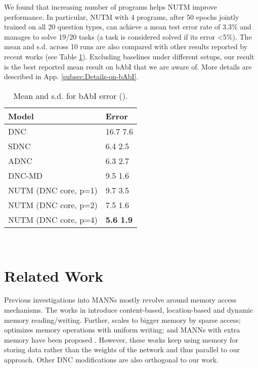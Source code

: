 \documentclass[english]{article}
\providecommand{\tabularnewline}{\\}
\renewcommand{\cite}{\citep}
\begin{document}
We found that increasing number of programs helps NUTM improve performance.
In particular, NUTM with 4 programs, after 50 epochs jointly trained
on all 20 question types, can achieve a mean test error rate of 3.3\%
and manages to solve 19/20 tasks (a task is considered solved if its
error \textless 5\%). The mean and s.d. across 10 runs are also compared
with other results reported by recent works (see Table \ref{tab:Mean-bAbI-error}).
Excluding baselines under different setups, our result is the best
reported mean result on bAbI that we are aware of. More details are
described in App. \ref{subsec:Details-on-bAbI}. 

\begin{table}
\begin{centering}
\begin{tabular}{ll}
\hline 
\multicolumn{1}{l}{Model} & Error\tabularnewline
\hline 
\multicolumn{1}{l}{DNC\cite{graves2016hybrid}} & 16.7 \textpm{} 7.6 \tabularnewline
\multicolumn{1}{l}{SDNC\cite{rae2016scaling}} & 6.4 \textpm{} 2.5 \tabularnewline
\multicolumn{1}{l}{ADNC\cite{W18-2606}} & 6.3 \textpm{} 2.7 \tabularnewline
\multicolumn{1}{l}{DNC-MD\cite{csordas2018improving}} & 9.5 \textpm{} 1.6\tabularnewline
\hline 
NUTM (DNC core, p=1) & 9.7 \textpm{} 3.5\tabularnewline
NUTM (DNC core, p=2) & 7.5 \textpm{} 1.6\tabularnewline
NUTM (DNC core, p=4) & \textbf{5.6 \textpm{} 1.9}\tabularnewline
\hline 
\end{tabular}
\par\end{centering}
~

\caption{Mean and s.d. for bAbI error ().\label{tab:Mean-bAbI-error}}

\end{table}

 
\section{Related Work}

Previous investigations into MANNs mostly revolve around memory access
mechanisms. The works in \citet{graves2014neural,graves2016hybrid}
introduce content-based, location-based and dynamic memory reading/writing.
Further, \citet{rae2016scaling} scales to bigger memory by sparse
access; \citet{le2018learning} optimizes memory operations with uniform
writing; and MANNs with extra memory have been proposed \cite{Le:2018:DMN:3219819.3219981}.
However, these works keep using memory for storing data rather than
the weights of the network and thus parallel to our approach. Other
DNC modifications \cite{csordas2018improving,W18-2606} are also orthogonal
to our work. 
\end{document}
